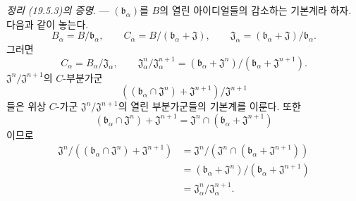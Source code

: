 \begin{env}[19.5.6]
\label{0.19.5.6-fr}
\emph{정리 (19.5.3)의 증명}. --- $(\mathfrak b_\alpha)$를 $B$의
열린 아이디얼들의 감소하는 기본계라 하자. 다음과 같이 놓는다.
\[
  B_\alpha=B/\mathfrak b_\alpha,\qquad
  C_\alpha=B/(\mathfrak b_\alpha+\mathfrak J),\qquad
  \mathfrak J_\alpha=
  (\mathfrak b_\alpha+\mathfrak J)/\mathfrak b_\alpha.
\]
그러면
\[
  C_\alpha=B_\alpha/\mathfrak J_\alpha,\qquad
  \mathfrak J_\alpha^n/\mathfrak J_\alpha^{n+1}
  =(\mathfrak b_\alpha+\mathfrak J^n)/
   (\mathfrak b_\alpha+\mathfrak J^{n+1}).
\]
$\mathfrak J^n/\mathfrak J^{n+1}$의 $C$-부분가군
\[
  ((\mathfrak b_\alpha\cap\mathfrak J^n)+\mathfrak J^{n+1})/
  \mathfrak J^{n+1}
\]
들은 위상 $C$-가군 $\mathfrak J^n/\mathfrak J^{n+1}$의 열린
부분가군들의 기본계를 이룬다. 또한
\[
  (\mathfrak b_\alpha\cap\mathfrak J^n)+\mathfrak J^{n+1}
  =\mathfrak J^n\cap
   (\mathfrak b_\alpha+\mathfrak J^{n+1})
\]
이므로
\[
\begin{aligned}
  \mathfrak J^n/
  ((\mathfrak b_\alpha\cap\mathfrak J^n)+\mathfrak J^{n+1})
  &=
  \mathfrak J^n/
  (\mathfrak J^n\cap(\mathfrak b_\alpha+\mathfrak J^{n+1}))\\
  &=
  (\mathfrak b_\alpha+\mathfrak J^n)/
  (\mathfrak b_\alpha+\mathfrak J^{n+1})\\
  &=\mathfrak J_\alpha^n/\mathfrak J_\alpha^{n+1}.
\end{aligned}
\]
\end{env}

